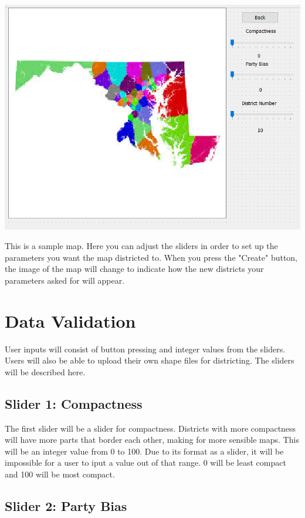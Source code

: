 \documentclass{article}
\begin{document}
\vspace{10mm}
	
\hspace*{5mm}   
\includegraphics[scale=.7]{mapWin.png}

\vspace{5mm}

This is a sample map.  Here you can adjust the sliders in order to set up the parameters you want the map districted to.  When you press the "Create" button, the image of the map will change to indicate how the new districts your parameters asked for will appear.
\section{Data Validation}
User inputs will consist of button pressing and integer values from the sliders.  Users will also be able to upload their own shape files for districting.  The sliders will be described here.

\subsection{Slider 1: Compactness}

The first slider will be a slider for compactness.  Districts with more compactness will have more parts that border each other, making for more sensible maps.  This will be an integer value from 0 to 100.  Due to its format as a slider, it will be impossible for a user to iput a value out of that range.  0 will be least compact and 100 will be most compact.

\subsection{Slider 2: Party Bias}
\end{document}
